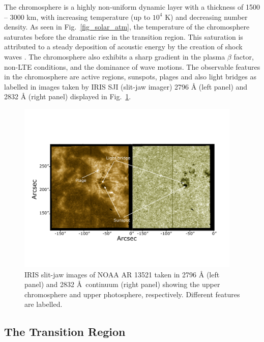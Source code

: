 The chromosphere is a highly non-uniform dynamic layer with a thickness of 1500 {--} 3000 km, with increasing temperature (up to $10^{4}$ K) and decreasing number density. As seen in Fig.~\ref{fig_solar_atm}, the temperature of the chromosphere saturates before the dramatic rise in the transition region. This saturation is attributed to a steady deposition of acoustic energy by the creation of shock waves \citep{carlsson07}. The chromosphere also exhibits a sharp gradient in the plasma $\beta$ factor, non-LTE conditions, and the dominance of wave motions. The observable features in the chromosphere are active regions, sunspots, plages and also light bridges as labelled in images taken by IRIS SJI (slit-jaw imager) 2796 {\AA} (left panel) and 2832 {\AA} (right panel) displayed in Fig.~\ref{fig:sji_features}.  

\begin{figure}[ht!]
    \centering
    \includegraphics[trim={1cm 3cm 2cm 5cm},clip,width=0.95\textwidth]{Figures/sji_images.pdf}
    \caption[IRIS SJI observation of NOAA AR 13521 on Dec 21st, 2023.]{IRIS slit-jaw images of NOAA AR 13521 taken in  2796 {\AA} (left panel) and 2832 {\AA}~continuum (right panel) showing the upper chromosphere and upper photosphere, respectively. Different features are labelled.} 
    \label{fig:sji_features}
\end{figure}

\subsection{The Transition Region}\label{transition-region}

